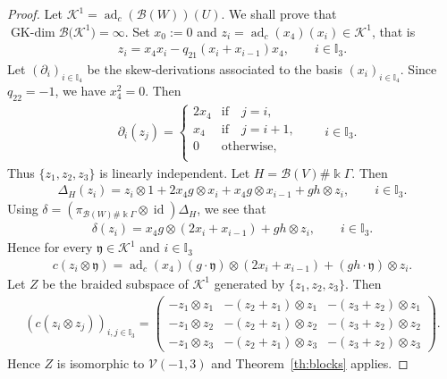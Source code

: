 \documentclass[pdftex]{sigma}
\numberwithin{equation}{section}
\newcommand{\adc}{\operatorname{ad}_c}
\newcommand{\GK}{\operatorname{GK-dim}}
\newcommand{\id}{\operatorname{id}}
\newcommand{\toba}{\mathscr B}
\newcommand{\K}{{\mathcal{K}}}
\newcommand{\I}{{\mathbb I}}
\begin{document}
\begin{proof} Let $\K^1 =\adc(\toba(W))(U)$. We shall prove that $\GK \toba\big(\K^1\big) = \infty$.
Set $x_0 := 0$ and $z_{i} =\adc(x_{4})(x_i) \in \K^1$, that is
\begin{align}\label{eq:zi-largeblock-point}
z_{i} = x_{4}x_i - q_{21}(x_i + x_{i-1})x_{4},\qquad i \in \I_{3}.
\end{align}
Let $(\partial_i)_{i \in \I_{4}}$ be the skew-derivations associated to the basis
$(x_i)_{i \in \I_{4}}$.
Since $q_{22} = -1$, we have $x_4^2 = 0$. Then
\begin{align*}
&\partial_i(z_{j}) =
\begin{cases}
2x_{4} & \mbox{if}\quad j = i, \\
x_{4} & \mbox{if}\quad j = i + 1, \\
0 & \text{otherwise,}\\
\end{cases}\qquad i \in \I_3.
\end{align*}
Thus $\{z_{1}, z_{2}, z_{3}\}$ is linearly independent.
Let $H = \toba(V)\# \Bbbk \Gamma$. Then
\begin{align*}
\Delta_{H}(z_{i}) = z_{i} \otimes 1 + 2x_{4} g \otimes x_i + x_{4} g \otimes x_{i-1} + gh \otimes z_{i},
\qquad i \in \I_3.
\end{align*}
Using $\delta =(\pi _{\toba (W)\# \Bbbk \Gamma}\otimes \id)\Delta _{H}$, we see that
\begin{align*}
\delta(z_{i}) = x_{4} g \otimes (2x_i + x_{i-1}) + gh \otimes z_{i},\qquad
 i \in \I_3.
\end{align*}
Hence for every $\mathfrak{y} \in \K^1$ and $i \in \I_3$
\begin{align*}
c(z_{i}\otimes \mathfrak{y}) = \adc(x_{4})(g \cdot \mathfrak{y}) \otimes (2x_i + x_{i-1})
+ (gh\cdot \mathfrak{y}) \otimes z_{i}.
\end{align*}
Let $Z$ be the braided subspace of $\K^1$ generated by $\big\{z_{1}, z_{2}, z_{3} \big\}$.
Then
\begin{align*}
(c(z_i \otimes z_j))_{i,j\in \I_3} =
\begin{pmatrix}
-z_{1} \otimes z_{1} & -(z_{2} + z_{1}) \otimes z_{1} & -(z_{3} + z_{2}) \otimes z_{1} \\
-z_{1} \otimes z_{2} & -(z_{2} + z_{1}) \otimes z_{2} & -(z_{3} + z_{2}) \otimes z_{2} \\
-z_{1} \otimes z_{3} & -(z_{2} + z_{1}) \otimes z_{3} & -(z_{3} + z_{2}) \otimes z_{3}
\end{pmatrix}\!.
\end{align*}
Hence $Z$ is isomorphic to $\mathcal{V}(-1, 3)$
and Theorem~\ref{th:blocks} applies.
\end{proof}
\end{document}
